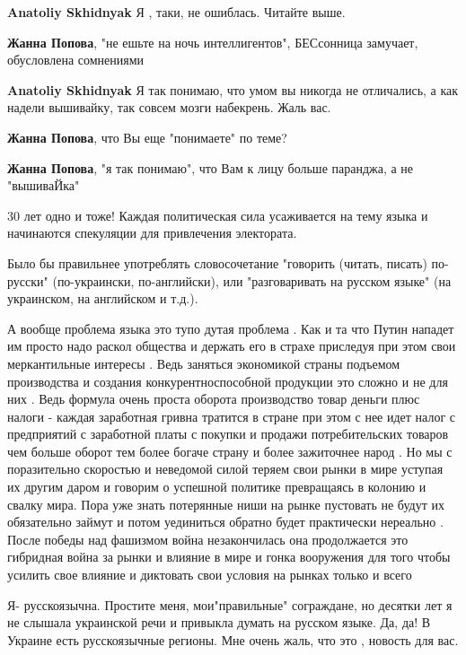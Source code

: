 \begin{itemize}
\begin{itemize}
\textbf{Anatoliy Skhidnyak}
Я , таки, не ошиблась. Читайте выше.

\textbf{Жанна Попова}, "не ешьте на ночь интеллигентов", БЕСсонница замучает, обусловлена сомнениями

\textbf{Anatoliy Skhidnyak}
Я так понимаю, что умом вы никогда не отличались, а как надели вышивайку, так совсем мозги набекрень. Жаль вас.

\textbf{Жанна Попова}, что Вы еще "понимаете" по теме?

\textbf{Жанна Попова}, "я так понимаю", что Вам к лицу больше паранджа, а не "вышиваЙка"
\end{itemize} %

30 лет одно и тоже! Каждая политическая сила усаживается на тему языка и начинаются спекуляции для привлечения электората.


Было бы правильнее употреблять словосочетание "говорить (читать, писать)
по-русски" (по-украински, по-английски), или "разговаривать на русском языке"
(на украинском, на английском и т.д.).


А вообще проблема языка это тупо дутая проблема . Как и та что Путин нападет им
просто надо раскол общества и держать его в страхе приследуя при этом свои
меркантильные интересы . Ведь заняться экономикой страны подъемом производства
и создания конкурентноспособной продукции это сложно и не для них . Ведь
формула очень проста оборота производство товар деньги плюс налоги - каждая
заработная гривна тратится в стране при этом с нее идет налог с предприятий с
заработной платы с покупки и продажи потребительских товаров чем больше оборот
тем более богаче страну и более зажиточнее народ . Но мы с поразительно
скоростью и неведомой силой теряем свои рынки в мире уступая их другим даром и
говорим о успешной политике превращаясь в колонию и свалку мира. Пора уже знать
потерянные ниши на рынке пустовать не будут их обязательно займут и потом
уединиться обратно будет практически нереально . После победы над фашизмом
война незакончилась она продолжается это гибридная война за рынки и влияние в
мире и гонка вооружения для того чтобы усилить свое влияние и диктовать свои
условия на рынках только и всего



Я- русскоязычна. Простите меня, мои"правильные" сограждане, но десятки лет я не
слышала украинской речи и привыкла думать на русском языке. Да, да! В Украине
есть русскоязычные регионы. Мне очень жаль, что это , новость для вас.


\end{itemize}
